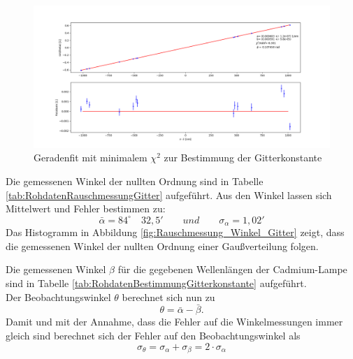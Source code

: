 \documentclass[12pt,a4paper]{article}
\begin{document}
	\begin{figure}
		\begin{center}
			\includegraphics[scale=0.4]{Bilder/Anpassung_Gitterkonstante.png}
		\end{center}
		\caption[Fit Gitterkonstante]{Geradenfit mit minimalem $\chi ^2$ zur Bestimmung der Gitterkonstante}
		\label{fig:Fit_Gitterkonstante}
	\end{figure}
	
	Die gemessenen Winkel der nullten Ordnung sind in Tabelle \ref{tab:RohdatenRauschmessungGitter} aufgeführt. Aus den Winkel lassen sich Mittelwert und Fehler bestimmen zu:
	\begin{equation*}
	\bar{\alpha} = 84^{\circ} \quad 32,5' \qquad und \qquad \sigma_{\alpha} = 1,02'
	\end{equation*}
	Das Histogramm in Abbildung \ref{fig:Rauschmessung_Winkel_Gitter} zeigt, dass die gemessenen Winkel der nullten Ordnung einer Gaußverteilung folgen.
	
	Die gemessenen Winkel $\beta$ für die gegebenen Wellenlängen der Cadmium-Lampe sind in Tabelle \ref{tab:RohdatenBestimmungGitterkonstante} aufgeführt.\\
	Der Beobachtungswinkel $\theta$ berechnet sich nun zu 
	\begin{equation}
	\theta = \bar{\alpha} - \bar{\beta}.
	\end{equation}
	Damit und mit der Annahme, dass die Fehler auf die Winkelmessungen immer gleich sind berechnet sich der Fehler auf den Beobachtungswinkel als
	\begin{equation}
	\sigma _{\theta} = \sigma _{\alpha} + \sigma _{\beta} = 2 \cdot \sigma _{\alpha}
	\end{equation}
	
\end{document}
